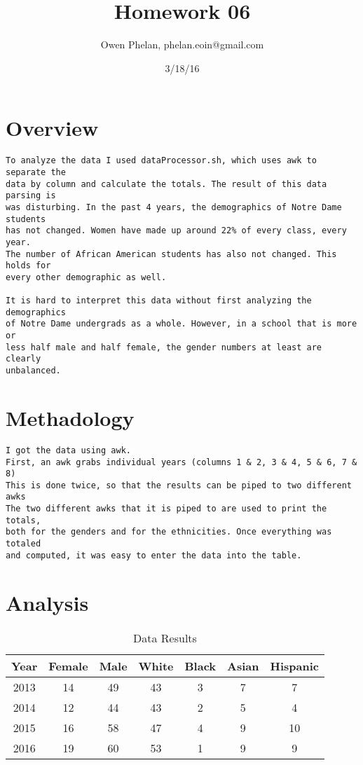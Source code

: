 \documentclass{article}
\title{Homework 06}
\date{3/18/16}
\author{Owen Phelan, phelan.eoin@gmail.com}
\begin{document}
	\maketitle
	\section{Overview}
	\begin{verbatim}
To analyze the data I used dataProcessor.sh, which uses awk to separate the 
data by column and calculate the totals. The result of this data parsing is 
was disturbing. In the past 4 years, the demographics of Notre Dame students 
has not changed. Women have made up around 22% of every class, every year. 
The number of African American students has also not changed. This holds for
every other demographic as well. 

It is hard to interpret this data without first analyzing the demographics
of Notre Dame undergrads as a whole. However, in a school that is more or 
less half male and half female, the gender numbers at least are clearly 
unbalanced. 

	\end{verbatim}
	\section{Methadology}
	\begin{verbatim}
I got the data using awk. 
First, an awk grabs individual years (columns 1 & 2, 3 & 4, 5 & 6, 7 & 8)
This is done twice, so that the results can be piped to two different awks
The two different awks that it is piped to are used to print the totals, 
both for the genders and for the ethnicities. Once everything was totaled 
and computed, it was easy to enter the data into the table.

	\end{verbatim}
	\newpage
	\section*{Analysis}
	\begin{table}[h!]
	    \centering
	    \begin{tabular}{c|c|c|c|c|c|c}
	    Year	& Female & Male   & White  & Black  & Asian   & Hispanic\\
	    \hline
	    2013		& 14 & 49 & 43 & 3 & 7 & 7\\
	    2014		& 12 & 44 & 43 & 2 & 5 & 4\\
	    2015		& 16 & 58 & 47 & 4 & 9 & 10\\
	    2016		& 19 & 60 & 53 & 1 & 9 & 9\\
	    \end{tabular}
	    \caption{Data Results}
	    \label{tbl:Data Results}
	\end{table}
\end{document}

